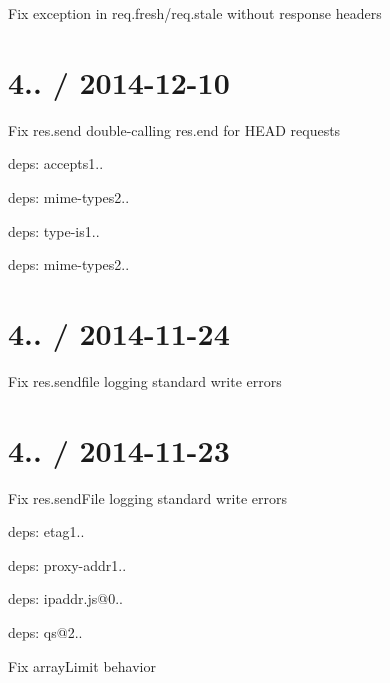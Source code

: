 {\ttfamily }

{\ttfamily 
\begin{DoxyItemize}
\item Fix exception in {\ttfamily req.\+fresh}/{\ttfamily req.\+stale} without response headers
\end{DoxyItemize}}

{\ttfamily \section*{4.. / 2014-\/12-\/10 }}

{\ttfamily }

{\ttfamily 
\begin{DoxyItemize}
\item Fix {\ttfamily res.\+send} double-\/calling {\ttfamily res.\+end} for {\ttfamily H\+E\+AD} requests
\item deps\+: accepts1..
\begin{DoxyItemize}
\item deps\+: mime-\/types2..
\end{DoxyItemize}
\item deps\+: type-\/is1..
\begin{DoxyItemize}
\item deps\+: mime-\/types2..
\end{DoxyItemize}
\end{DoxyItemize}}

{\ttfamily \section*{4.. / 2014-\/11-\/24 }}

{\ttfamily }

{\ttfamily 
\begin{DoxyItemize}
\item Fix {\ttfamily res.\+sendfile} logging standard write errors
\end{DoxyItemize}}

{\ttfamily \section*{4.. / 2014-\/11-\/23 }}

{\ttfamily }

{\ttfamily 
\begin{DoxyItemize}
\item Fix {\ttfamily res.\+send\+File} logging standard write errors
\item deps\+: etag1..
\item deps\+: proxy-\/addr1..
\begin{DoxyItemize}
\item deps\+: ipaddr.\+js@0..
\end{DoxyItemize}
\item deps\+: qs@2..
\begin{DoxyItemize}
\item Fix {\ttfamily array\+Limit} behavior
\end{DoxyItemize}
\end{DoxyItemize}}

